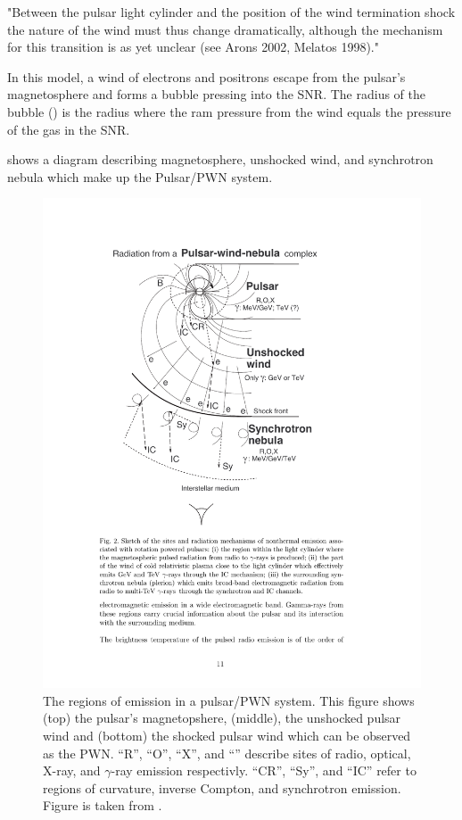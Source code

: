 "Between the pulsar light cylinder and the position of the wind
termination shock the nature of the wind must thus change dramatically,
although the mechanism for this transition is as yet unclear (see Arons
2002, Melatos 1998)."


In this model, a wind of electrons and positrons escape from
the pulsar's magnetosphere and forms a bubble pressing into the
\ac{SNR}. The radius of the bubble (\radiusterminationshock) is the
radius where the ram pressure from the wind equals the pressure of the
gas in the \ac{SNR}. 

 shows a
diagram describing magnetosphere, unshocked wind, and synchrotron
nebula which make up the Pulsar/\ac{PWN} system.

\begin{figure}[htpb]
  \begin{center}
    \includegraphics[width=\textwidth]{chapters/introduction/figures/termination_shock.pdf}
  \end{center}
  \caption{The regions of emission in a pulsar/\ac{PWN} system. 
  This figure shows (top) the pulsar's magnetopshere, (middle), the
  unshocked pulsar wind and (bottom) the shocked pulsar wind which can
  be observed as the \ac{PWN}.
  ``R'', ``O'', ``X'', and ``\gamma'' describe sites of radio, optical, X-ray, and
  $\gamma$-ray emission respectivly.
  ``CR'', ``Sy'', and ``IC'' refer to regions of curvature, inverse Compton, and
  synchrotron emission.
  Figure is taken from \cite{aharonian_2003_exploring-physics}.}
\end{figure}

